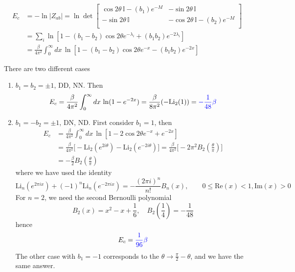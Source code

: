 \documentclass{article}
\begin{document}
\begin{equation}
\begin{aligned}
E_c   &= - \ln |Z_{ab}| = \ln \det 
\begin{bmatrix}
\cos 2 \theta \, \mathbb{I}  - (b_1) e^{-M} & - \sin 2 \theta \, \mathbb{I} \\
-\sin 2 \theta \, \mathbb{I}  & -\cos 2 \theta \, \mathbb{I}  - (b_2) e^{-M} \\
\end{bmatrix}\\
&= \sum_i \ln [1  - ( b_1 - b_2 ) \cos 2 \theta e^{-\lambda_i } + ( b_1 b_2) e^{-2 \lambda_i } ]  \\
&= \frac{\beta}{4\pi^2} \int_0^{\infty} dx \,\ln [1 -( b_1 - b_2 ) \cos 2 \theta e^{-x } - ( b_1 b_2) e^{-2 x} ] 
\end{aligned}
\end{equation}

There are two different cases
\begin{enumerate}
\item $b_1 = b_2 = \pm 1$, DD, NN. Then
\begin{equation}
  E_c = \frac{\beta}{4\pi^2} \int_0^{\infty} dx \,\ln (1 - e^{-2 x} ) = \frac{\beta}{8\pi^2}( - \text{Li}_2 (1) ) = {\color{blue}- \frac{1}{48}\beta}
\end{equation}
\item $b_1 = -b_2 = \pm 1$, DN, ND. First consider $b_1 = 1$, then
\begin{equation}
\label{eq:dn_lambda_bd_state}
\begin{aligned}
E_c &=  \frac{\beta}{4\pi^2} \int_0^{\infty} dx \,\ln [1 - 2  \cos 2 \theta e^{-x } + e^{-2 x} ] \\
&= \frac{\beta}{4\pi^2} \Big[-\text{Li}_2(e^{2i \theta} ) -  \text{Li}_2(e^{-2i \theta} ) \Big]  = \frac{\beta}{4\pi^2} \Big[-2 \pi^2 B_2 ( \frac{\theta}{\pi }) \Big]\\
&= - \frac{\beta}{2} B_2 ( \frac{\theta}{\pi })
\end{aligned}
\end{equation}
where we have used the identity
\begin{equation}
\text{Li}_n( e^{ 2\pi i x }) + (-1)^n \text{Li}_n ( e^{-2\pi i x} ) = - \frac{(2\pi i )^n}{ n!} B_n ( x) , \qquad 0 \le \text{Re}(x)<1, \text{Im}(x) > 0 
\end{equation}
For $n = 2$, we need the second Bernoulli polynomial
\begin{equation}
B_2( x) = x^2 - x + \frac{1}{6} , \quad B_2( \frac{1}{4} ) = - \frac{1}{48} 
\end{equation}
hence
\begin{equation}
E_c = {\color{blue} \frac{1}{96}\beta } 
\end{equation}
The other case with $b_1 = -1$ corresponds to the $\theta \rightarrow \frac{\pi}{2} - \theta$, and we have the same answer. 
\end{enumerate}
\end{document}
